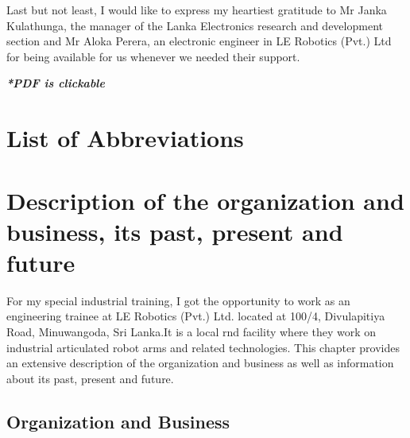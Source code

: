 \documentclass[a4paper,12pt]{report}%
\begin{document}
Last but not least, I would like to express my heartiest gratitude to Mr Janka Kulathunga, the manager of the Lanka Electronics research and development section and Mr Aloka Perera, an electronic engineer in LE Robotics (Pvt.) Ltd for being available for us whenever we needed their support.




\tableofcontents %
\vfill
\begin{center}
	\textbf{\textit{*PDF is clickable}}
\end{center}

\chapter*{List of Abbreviations}


\listoffigures %
\listoftables %




\pagebreak

\chapter{Description of the organization and business, its past, present and	future}

For my special industrial training, I got the opportunity to work as an engineering trainee at LE Robotics (Pvt.) Ltd. located at 100/4, Divulapitiya Road, Minuwangoda, Sri Lanka.It is a local \ac{rnd} facility where they work on industrial articulated robot arms and related technologies. This chapter provides an extensive description of the organization and business as well as information about its past, present and future.

\section{Organization and Business}
\end{document}
